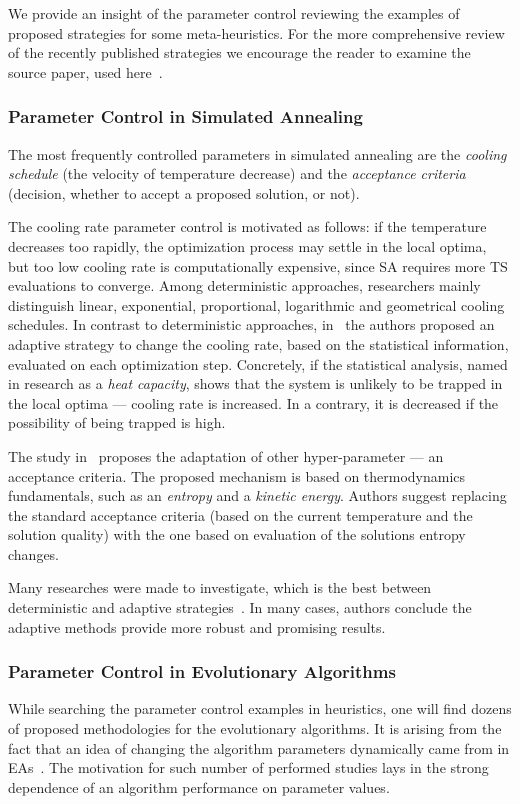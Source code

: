 We provide an insight of the parameter control reviewing the examples of proposed strategies for some meta-heuristics. For the more comprehensive review of the recently published strategies we encourage the reader to examine the source paper, used here~\cite{huang2019survey}.


\subsubsection{Parameter Control in Simulated Annealing}\label{bg: parameter control: SA}
The most frequently controlled parameters in simulated annealing are the \emph{cooling schedule} (the velocity of temperature decrease) and the \emph{acceptance criteria} (decision, whether to accept a proposed solution, or not).

The cooling rate parameter control is motivated as follows: if the temperature decreases too rapidly, the optimization process may settle in the local optima, but too low cooling rate is computationally expensive, since SA requires more TS evaluations to converge. Among deterministic approaches, researchers mainly distinguish linear, exponential, proportional, logarithmic and geometrical cooling schedules. In contrast to deterministic approaches, in~\cite{karabin2020simulated} the authors proposed an adaptive strategy to change the cooling rate, based on the statistical information, evaluated on each optimization step. Concretely, if the statistical analysis, named in research as a \emph{heat capacity}, shows that the system is unlikely to be trapped in the local optima — cooling rate is increased. In a contrary, it is decreased if the possibility of being trapped is high.

The study in~\cite{ghandeshtani2019entropy} proposes the adaptation of other hyper-parameter — an acceptance criteria. The proposed mechanism is based on thermodynamics fundamentals, such as an \emph{entropy} and a \emph{kinetic energy}. Authors suggest replacing the standard acceptance criteria (based on the current temperature and the solution quality) with the one based on evaluation of the solutions entropy changes.

Many researches were made to investigate, which is the best between deterministic and adaptive strategies~\cite{thompson1995general,ingber2000adaptive,de2003placement,azizi2004adaptive,lou2016parallel}. In many cases, authors conclude the adaptive methods provide more robust and promising results.


\subsubsection{Parameter Control in Evolutionary Algorithms}
While searching the parameter control examples in heuristics, one will find dozens of proposed methodologies for the evolutionary algorithms. It is arising from the fact that an idea of changing the algorithm parameters dynamically came from in EAs~\cite{karafotias2014parameter}. The motivation for such number of performed studies lays in the strong dependence of an algorithm performance on parameter values. 

